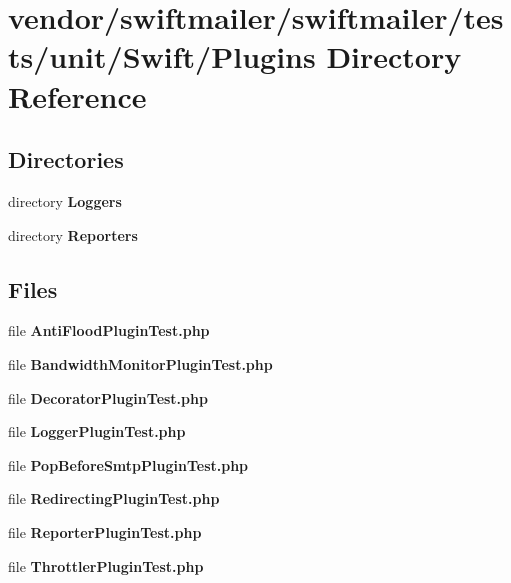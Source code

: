 \section{vendor/swiftmailer/swiftmailer/tests/unit/\+Swift/\+Plugins Directory Reference}
\label{dir_fb9b7af40828b2c8b34e2f071a6afb67}
\subsection*{Directories}
\begin{DoxyCompactItemize}
\item 
directory {\bf Loggers}
\item 
directory {\bf Reporters}
\end{DoxyCompactItemize}
\subsection*{Files}
\begin{DoxyCompactItemize}
\item 
file {\bf Anti\+Flood\+Plugin\+Test.\+php}
\item 
file {\bf Bandwidth\+Monitor\+Plugin\+Test.\+php}
\item 
file {\bf Decorator\+Plugin\+Test.\+php}
\item 
file {\bf Logger\+Plugin\+Test.\+php}
\item 
file {\bf Pop\+Before\+Smtp\+Plugin\+Test.\+php}
\item 
file {\bf Redirecting\+Plugin\+Test.\+php}
\item 
file {\bf Reporter\+Plugin\+Test.\+php}
\item 
file {\bf Throttler\+Plugin\+Test.\+php}
\end{DoxyCompactItemize}
